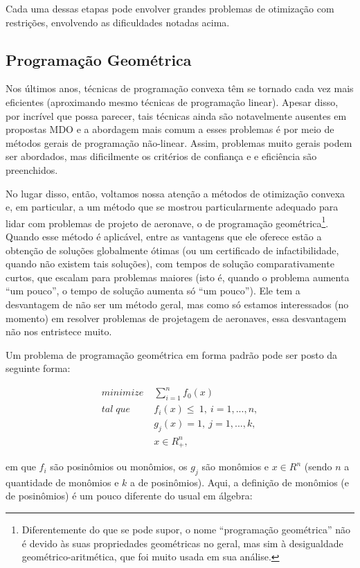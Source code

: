 \documentclass{article}
\begin{document}
Cada uma dessas etapas pode envolver grandes problemas de otimização
com restrições, envolvendo as dificuldades notadas acima.

\subsection{Programação Geométrica}

Nos últimos anos, técnicas de programação convexa têm se tornado cada
vez mais eficientes (aproximando mesmo técnicas de programação
linear).  Apesar disso, por incrível que possa parecer, tais técnicas
ainda são notavelmente ausentes em propostas MDO\cite{hoburg} e a
abordagem mais comum a esses problemas é por meio de métodos gerais de
programação não-linear. Assim, problemas muito gerais podem ser
abordados, mas dificilmente os critérios de confiança e e eficiência
são preenchidos.

No lugar disso, então, voltamos nossa atenção a métodos de otimização
convexa e, em particular, a um método que se mostrou particularmente
adequado para lidar com problemas de projeto de aeronave, o de
programação geométrica\footnote{Diferentemente do que se pode supor, o
  nome ``programação geométrica'' não é devido às suas propriedades
  geométricas no geral, mas sim à desigualdade geométrico-aritmética,
  que foi muito usada em sua análise.}. Quando esse método é
aplicável, entre as vantagens que ele oferece estão a obtenção de
soluções globalmente ótimas (ou um certificado de infactibilidade,
quando não existem tais soluções), com tempos de solução
comparativamente curtos, que escalam para problemas maiores (isto é,
quando o problema aumenta ``um pouco'', o tempo de solução aumenta só
``um pouco''). Ele tem a desvantagem de não ser um método geral, mas
como só estamos interessados (no momento) em resolver problemas de
projetagem de aeronaves, essa desvantagem não nos entristece muito.

Um problema de programação geométrica em forma padrão pode ser posto
da seguinte forma:

\begin{align*}
  minimize \;& \sum\limits_{i=1}^n f_0(x)\\ tal\; que\;& f_i(x) \leq\
  1,\ i = 1, ..., n,\\ & g_j(x) = 1,\ j = 1, ..., k,\\ & x \in R^n_{+},
\end{align*}

\noindent em que $f_i$ são posinômios ou monômios, os $g_j$ são
monômios e $x \in R^n$ (sendo $n$ a quantidade de monômios e $k$ a de
posinômios). Aqui, a definição de monômios (e de posinômios) é um
pouco diferente do usual em álgebra:
\end{document}
